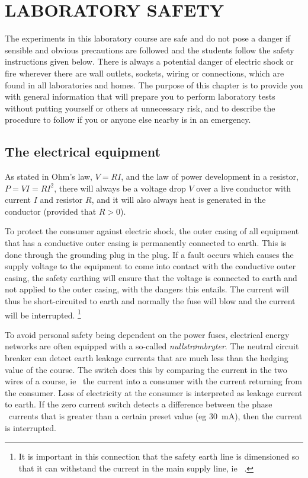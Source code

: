 \documentclass[../Elmag-labhefte-2020.tex]{subfiles}
\begin{document}
\chapter{LABORATORY SAFETY \label{ch.elektrisitet}}


\vspace{1.5cm}


The experiments in this laboratory course are safe and do not pose a danger if sensible and obvious precautions are followed and the students follow the safety instructions given below. There is always a potential danger of electric shock or fire wherever there are wall outlets, sockets, wiring or connections, which are found in all laboratories and homes. The purpose of this chapter is to provide you with general information that will prepare you to perform laboratory tests without putting yourself or others at unnecessary risk, and to describe the procedure to follow if you or anyone else nearby is in an emergency.

\section{The electrical equipment}



As stated in Ohm's law, $V = RI$, and the law of power development in a resistor, $P = VI = RI^2$, there will always be a voltage drop $V$ over a live conductor with current $I$ and resistor $R$, and it will also always heat is generated in the conductor (provided that $R > 0$).
 

To protect the consumer against electric shock, the outer casing of all equipment that has a conductive outer casing is permanently connected to earth. This is done through the grounding plug in the plug. If a fault occurs which causes the supply voltage to the equipment to come into contact with the conductive outer casing, the safety earthing will ensure that the voltage is connected to earth and not applied to the outer casing, with the dangers this entails. The current will thus be short-circuited to earth and normally the fuse will blow and the current will be interrupted. \footnote{It is important in this connection that the safety earth line is dimensioned so that it can withstand the current in the main supply line, ie \ .}

To avoid personal safety being dependent on the power fuses, electrical energy networks are often equipped with a so-called \emph{nullstrømbryter}. The neutral circuit breaker can detect earth leakage currents that are much less than the hedging value of the course. The switch does this by comparing the current in the two wires of a course, ie \ the current into a consumer with the current returning from the consumer. Loss of electricity at the consumer is interpreted as leakage current to earth. If the zero current switch detects a difference between the phase \ currents that is greater than a certain preset value (eg \SI{30}{\milli\ampere}), then the current is interrupted.
\end{document}
